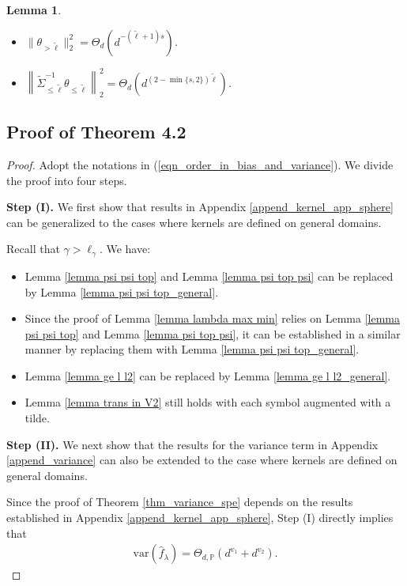 \documentclass{article}
\theoremstyle{plain}
\newtheorem{lemma}[theorem]{Lemma}
\theoremstyle{definition}
\theoremstyle{remark}
\begin{document}
\begin{appendix}
\begin{lemma}
\begin{itemize}
    \item[(ii)] $\| \theta_{>\tilde{\ell}} \|_{2}^{2}  = \Theta_d \left(  d^{-(\tilde{\ell}+1)s} \right)$.

    \item[(iii)] $\left\| \tilde{\Sigma}_{\leq \tilde{\ell}}^{-1}  \theta_{\leq \tilde{\ell}} \right\|_{2}^{2}  = \Theta_{d} \left(  d^{(2-\min\{s, 2\})\tilde{\ell} } \right)$.
\end{itemize}
\end{lemma}






\subsection{Proof of Theorem 4.2}
\begin{proof}
    Adopt the notations in (\ref{eqn_order_in_bias_and_variance}). We divide the proof into four steps.

{\bf Step (I). } We first show that results in Appendix \ref{append_kernel_app_sphere} can be generalized to the cases where kernels are defined on general domains. 

Recall that $\gamma > \ell_{\gamma}$. We have:
\begin{itemize}
    \item Lemma \ref{lemma psi psi top} and Lemma \ref{lemma psi top psi} can be replaced by Lemma \ref{lemma psi psi top_general}.

    \item Since the proof of Lemma \ref{lemma lambda max min} relies on Lemma \ref{lemma psi psi top} and Lemma \ref{lemma psi top psi}, it can be established in a similar manner by replacing them with Lemma \ref{lemma psi psi top_general}.

    \item Lemma \ref{lemma ge l l2} can be replaced by Lemma \ref{lemma ge l l2_general}.

    \item Lemma \ref{lemma trans in V2} still holds with each symbol augmented with a tilde.

    
\end{itemize}



{\bf Step (II). } We next show that the results for the variance term in Appendix \ref{append_variance} can also be extended to the case where kernels are defined on general domains.

Since the proof of Theorem \ref{thm_variance_spe} depends on the results established in Appendix \ref{append_kernel_app_sphere}, Step (I) directly implies that
\begin{equation*}
    \begin{aligned}
      \mathrm{var}\left( \hat{f}_{\lambda} \right) =
        \Theta_{d, \mathbb{P}}\left(
        d^{v_1} + d^{v_2}
\right).
    \end{aligned}
\end{equation*}



\end{proof}
\end{appendix}
\end{document}
